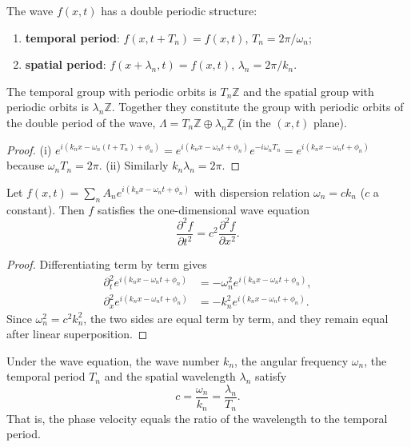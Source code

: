 \begin{proposition}\label{prop:wave_double_period}
The wave $f(x,t)$ has a double periodic structure:
\begin{enumerate}[label=(\roman*)]
    \item \textbf{temporal period}: $f(x, t + T_n) = f(x, t)$, $T_n = 2\pi/\omega_n$;
    \item \textbf{spatial period}: $f(x + \lambda_n, t) = f(x, t)$, $\lambda_n = 2\pi/k_n$.
\end{enumerate}
The temporal group with periodic orbits is $T_n\mathbb{Z}$ and the spatial group with periodic orbits is $\lambda_n\mathbb{Z}$. Together they constitute the group with periodic orbits of the double period of the wave, $\Lambda = T_n\mathbb{Z} \oplus \lambda_n\mathbb{Z}$ (in the $(x,t)$ plane).
\end{proposition}

\begin{proof}
(i) $e^{i(k_n x - \omega_n(t+T_n) + \phi_n)} = e^{i(k_n x - \omega_n t + \phi_n)} e^{-i\omega_n T_n} = e^{i(k_n x - \omega_n t + \phi_n)}$ because $\omega_n T_n = 2\pi$. (ii) Similarly $k_n \lambda_n = 2\pi$.
\end{proof}

\begin{proposition}\label{prop:wave_satisfies_wave_equation}
Let $f(x,t) = \sum_n A_n e^{i(k_n x - \omega_n t + \phi_n)}$ with dispersion relation $\omega_n = c k_n$ ($c$ a constant). Then $f$ satisfies the one-dimensional wave equation
\[
\frac{\partial^2 f}{\partial t^2} = c^2 \frac{\partial^2 f}{\partial x^2}.
\]
\end{proposition}

\begin{proof}
Differentiating term by term gives
\[
\begin{aligned}
\partial_t^2 e^{i(k_n x-\omega_n t+\phi_n)} &= -\omega_n^2 e^{i(k_n x-\omega_n t+\phi_n)},\\
\partial_x^2 e^{i(k_n x-\omega_n t+\phi_n)} &= -k_n^2 e^{i(k_n x-\omega_n t+\phi_n)}.
\end{aligned}
\]
Since $\omega_n^2 = c^2 k_n^2$, the two sides are equal term by term, and they remain equal after linear superposition.
\end{proof}

\begin{corollary}\label{cor:dispersion_double_period}
Under the wave equation, the wave number $k_n$, the angular frequency $\omega_n$, the temporal period $T_n$ and the spatial wavelength $\lambda_n$ satisfy
\[
c = \frac{\omega_n}{k_n} = \frac{\lambda_n}{T_n}.
\]
That is, the phase velocity equals the ratio of the wavelength to the temporal period.
\end{corollary}

